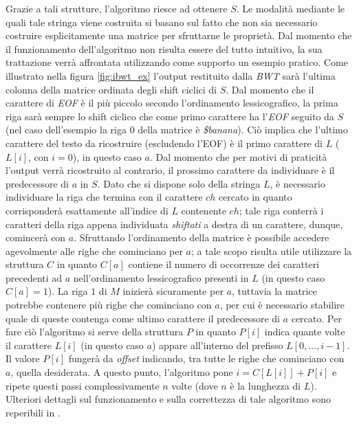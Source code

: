 {{Grazie a tali strutture, l'algoritmo riesce ad ottenere $S$. Le modalità mediante le quali tale stringa viene costruita si basano sul fatto che non sia necessario costruire esplicitamente una matrice per sfruttarne le proprietà. Dal momento che il funzionamento dell'algoritmo non risulta essere del tutto intuitivo, la sua trattazione verrà affrontata utilizzando come supporto un esempio pratico. Come illustrato nella figura \ref{fig:ibwt_ex} l'output restituito dalla \emph{BWT} sarà l'ultima colonna della matrice ordinata degli shift ciclici di $S$. Dal momento che il carattere di \emph{EOF} è il più piccolo secondo l'ordinamento lessicografico, la prima riga sarà sempre lo shift ciclico che come primo carattere ha l'\emph{EOF} seguito da $S$ (nel caso dell'esempio la riga $0$ della matrice è \emph{\$banana}). Ciò implica che l'ultimo carattere del testo da ricostruire (escludendo l'EOF) è il primo carattere di $L$ ($L[i]$, con $i=0$), in questo caso $a$. Dal momento che per motivi di praticità l'output verrà ricostruito al contrario, il prossimo carattere da individuare è il predecessore di $a$ in $S$. Dato che si dispone solo della stringa $L$, è necessario individuare la riga che termina con il carattere $ch$ cercato in quanto corrisponderà esattamente all'indice di $L$ contenente $ch$; tale riga conterrà i caratteri della riga appena individuata \emph{shiftati} a destra di un carattere, dunque, comincerà con $a$. Sfruttando l'ordinamento della matrice è possibile accedere agevolmente alle righe che cominciano per $a$; a tale scopo risulta utile utilizzare la struttura $C$ in quanto $C[a]$ contiene il numero di occorrenze dei caratteri precedenti ad $a$ nell'ordinamento lessicografico presenti in $L$ (in questo caso $C[a]=1$). La riga $1$ di $M$ inizierà sicuramente per $a$, tuttavia la matrice potrebbe contenere più righe che cominciano con $a$, per cui è necessario stabilire quale di queste contenga come ultimo carattere il predecessore di $a$ cercato. Per fare ciò l'algoritmo si serve della struttura $P$ in quanto $P[i]$ indica quante volte il carattere $L[i]$ (in questo caso $a$) appare all'interno del prefisso $L[0,\dots,i-1]$. Il valore $P[i]$ fungerà da \emph{offset} indicando, tra tutte le righe che cominciano con $a$, quella desiderata. A questo punto, l'algoritmo pone $i=C[L[i]]+P[i]$ e ripete questi passi complessivamente $n$ volte (dove $n$ è la lunghezza di $L$). Ulteriori dettagli sul funzionamento e sulla correttezza di tale algoritmo sono reperibili in \cite{burrows1994block}. 
} }
